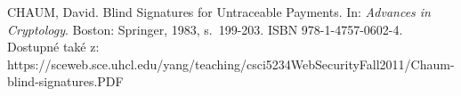 \begin{thebibliography}{1}

CHAUM, David. Blind Signatures for Untraceable Payments. In: \textit{Advances in Cryptology}. Boston: Springer, 1983, s.~199-203. ISBN 978-1-4757-0602-4. Dostupné také z: https://sceweb.sce.uhcl.edu/yang/teaching/csci5234WebSecurityFall2011/Chaum-blind-signatures.PDF

\end{thebibliography}